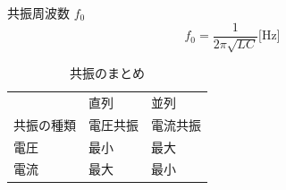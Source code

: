 \begin{multicols}{3}
        \begin{itembox}[l]{共振周波数 $f_0$}
            \[
                f_0 = \dfrac{1}{2\pi \sqrt{LC}}  \text{[Hz]}
            \]
        \end{itembox}


        \begin{table}[H]
            \caption{共振のまとめ}
            \label{tab:共振}
            \begin{center}
                \begin{tabular}{|lll|} \hline
                & 直列 & 並列  \\
                    共振の種類& 電圧共振 & 電流共振 \\
                    電圧& 最小 & 最大 \\
                    電流& 最大 & 最小 \\ \hline
                \end{tabular}
            \end{center}
        \end{table}
\here
    \end{multicols}